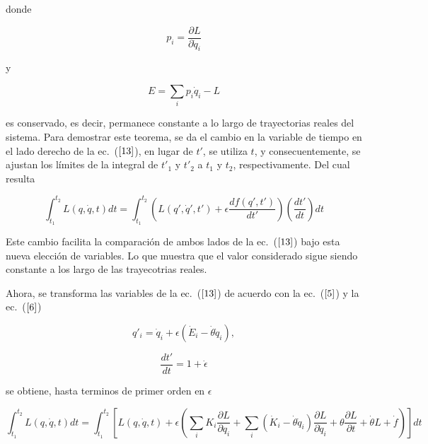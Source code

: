 \documentclass[a4paper,11pt]{article}
\begin{document}
donde

\begin{equation}
    p_i=\frac{\partial L}{\partial \dot{q}_i}
\end{equation}


y 



\begin{equation}
    E= \sum_i p_i \dot{q}_i - L
\end{equation}

es conservado, es decir, permanece constante a lo largo de trayectorias reales del sistema. Para demostrar este teorema, se da el cambio en la variable de tiempo en el lado derecho de la ec.~(\(\ref{13}\)), en lugar de \(t'\), se utiliza \(t\), y consecuentemente, se ajustan los límites de la integral de \(t'_1\) y \(t'_2\) a \(t_1\) y \(t_2\), respectivamente. Del cual resulta

\begin{equation}
    \int_{t_1}^{t_2} L(q, \dot{q},t) dt = \int_{t_1}^{t_2} \left( L(q',\dot{q}',t') +\epsilon \frac{df(q',t')}{dt'}\right) \left(\frac{dt'}{dt} \right) dt
    \label{17}
\end{equation}

Este cambio facilita la comparación de ambos lados de la ec.~(\(\ref{13}\)) bajo esta nueva elección de variables. 
Lo que muestra que el valor considerado sigue siendo constante a los largo de las trayecotrias reales. 


Ahora, se transforma las variables de la ec.~(\(\ref{13}\)) de acuerdo con la ec.~(\(\ref{5}\)) y la ec.~(\(\ref{6}\)) 

\begin{equation}
    q'_i=\dot{q}_i+\epsilon(\dot{E}_i-\dot{\theta} \dot{q}_i), 
\end{equation}

\begin{equation}
    \frac{dt'}{dt}=1+\dot{\epsilon}
\end{equation}

se obtiene, hasta terminos de primer orden en \(\epsilon \)

\begin{equation}
     \int_{t_1}^{t_2} L(q, \dot{q},t) dt = \int_{t_1}^{t_2} \left[L(q,\dot{q},t) +\epsilon \left( \sum_i K_i \frac{\partial L}{\partial q_i} + \sum_i (\dot{K}_i - \dot{\theta} \dot{q}_i) \frac{\partial L}{\partial \dot{q}_i} +\theta\frac{\partial L}{\partial t} +\dot{\theta} L +\dot{f} \right) \right] dt
\label{20}
\end{equation}
\end{document}
